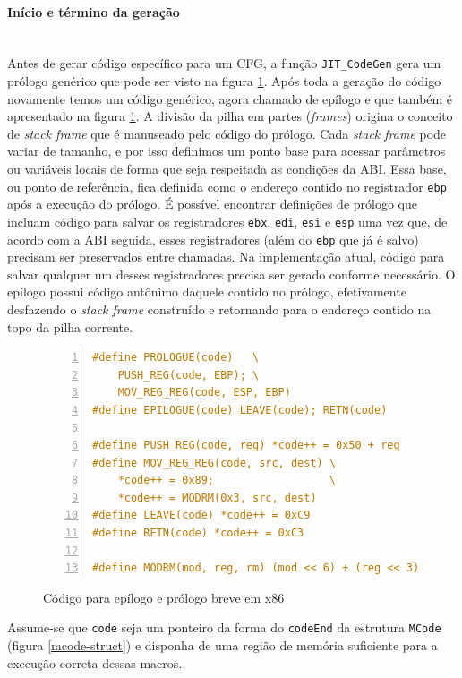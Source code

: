 \paragraph{Início e término da geração}
\quad \\
Antes de gerar código específico para um CFG, a função
\verb!JIT_CodeGen! gera um prólogo genérico que pode ser visto na
figura \ref{prologo-epilogo}. Após toda a geração do código novamente
temos um código genérico, agora chamado de epílogo e que também é
apresentado na figura \ref{prologo-epilogo}. A divisão da pilha em
partes (\textit{frames}) origina o conceito de \textit{stack frame}
que é manuseado pelo código do prólogo. Cada \textit{stack frame} pode
variar de tamanho, e por isso definimos um ponto base para acessar
parâmetros ou variáveis locais de forma que seja respeitada as
condições da ABI. Essa base, ou ponto de referência, fica definida como
o endereço contido no registrador \verb!ebp! após a execução do
prólogo. É possível encontrar definições de prólogo que incluam código
para salvar os registradores \verb!ebx!, \verb!edi!, \verb!esi!
e \verb!esp! uma vez que, de acordo com a ABI seguida, esses
registradores (além do \verb!ebp! que já é salvo) precisam ser
preservados entre chamadas. Na
implementação atual, código para salvar qualquer um desses
registradores precisa ser gerado conforme necessário. O epílogo possui
código antônimo daquele contido no prólogo, efetivamente desfazendo o
\textit{stack frame} construído e retornando para o endereço contido
na topo da pilha corrente.

\begin{figure}[h]
  \centering
  \begin{lstlisting}[language=C, numbers=left]
#define PROLOGUE(code)   \
    PUSH_REG(code, EBP); \
    MOV_REG_REG(code, ESP, EBP)
#define EPILOGUE(code) LEAVE(code); RETN(code)

#define PUSH_REG(code, reg) *code++ = 0x50 + reg
#define MOV_REG_REG(code, src, dest) \
    *code++ = 0x89;                  \
    *code++ = MODRM(0x3, src, dest)
#define LEAVE(code) *code++ = 0xC9
#define RETN(code) *code++ = 0xC3

#define MODRM(mod, reg, rm) (mod << 6) + (reg << 3) + rm
  \end{lstlisting}
  \caption{Código para epílogo e prólogo breve em x86\label{prologo-epilogo}}
\end{figure}

Assume-se que \verb!code! seja um ponteiro da forma do \verb!codeEnd!
da estrutura \verb!MCode! (figura \ref{mcode-struct}) e disponha de
uma região de memória suficiente para a execução correta dessas macros.

